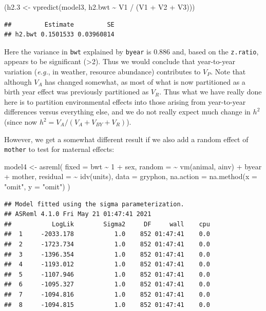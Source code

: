 \documentclass[
  12pt,
]{book}
\newenvironment{Shaded}{\begin{snugshade}}{\end{snugshade}}
\newcommand{\AttributeTok}[1]{\textcolor[rgb]{0.77,0.63,0.00}{#1}}
\newcommand{\DecValTok}[1]{\textcolor[rgb]{0.00,0.00,0.81}{#1}}
\newcommand{\FloatTok}[1]{\textcolor[rgb]{0.00,0.00,0.81}{#1}}
\newcommand{\FunctionTok}[1]{\textcolor[rgb]{0.00,0.00,0.00}{#1}}
\newcommand{\NormalTok}[1]{#1}
\newcommand{\OtherTok}[1]{\textcolor[rgb]{0.56,0.35,0.01}{#1}}
\newcommand{\SpecialCharTok}[1]{\textcolor[rgb]{0.00,0.00,0.00}{#1}}
\newcommand{\StringTok}[1]{\textcolor[rgb]{0.31,0.60,0.02}{#1}}
\begin{document}
\begin{Shaded}
\begin{Highlighting}[]
\NormalTok{(h2}\FloatTok{.3} \OtherTok{\textless{}{-}} \FunctionTok{vpredict}\NormalTok{(model3, h2.bwt }\SpecialCharTok{\textasciitilde{}}\NormalTok{ V1 }\SpecialCharTok{/}\NormalTok{ (V1 }\SpecialCharTok{+}\NormalTok{ V2 }\SpecialCharTok{+}\NormalTok{ V3)))}
\end{Highlighting}
\end{Shaded}

\begin{verbatim}
##         Estimate         SE
## h2.bwt 0.1501533 0.03960814
\end{verbatim}

Here the variance in \texttt{bwt} explained by \texttt{byear} is 0.886 and, based on the \texttt{z.ratio}, appears to be significant (\textgreater2). Thus we would conclude that year-to-year variation (\emph{e.g.}, in weather, resource abundance) contributes to \(V_P\). Note that although \(V_A\) has changed somewhat, as most of what is now partitioned as a birth year effect was previously partitioned as \(V_R\). Thus what we have really done here is to partition environmental effects into those arising from year-to-year differences versus everything else, and we do not really expect much change in \(h^2\) (since now \(h^2 = V_A/ (V_A+V_{BY}+V_R)\)).

However, we get a somewhat different result if we also add a random effect of \texttt{mother} to test for maternal effects:

\begin{Shaded}
\begin{Highlighting}[]
\NormalTok{model4 }\OtherTok{\textless{}{-}} \FunctionTok{asreml}\NormalTok{(}
  \AttributeTok{fixed =}\NormalTok{ bwt }\SpecialCharTok{\textasciitilde{}} \DecValTok{1} \SpecialCharTok{+}\NormalTok{ sex,}
  \AttributeTok{random =} \SpecialCharTok{\textasciitilde{}} \FunctionTok{vm}\NormalTok{(animal, ainv) }\SpecialCharTok{+}\NormalTok{ byear }\SpecialCharTok{+}\NormalTok{ mother,}
  \AttributeTok{residual =} \SpecialCharTok{\textasciitilde{}} \FunctionTok{idv}\NormalTok{(units),}
  \AttributeTok{data =}\NormalTok{ gryphon,}
  \AttributeTok{na.action =} \FunctionTok{na.method}\NormalTok{(}\AttributeTok{x =} \StringTok{"omit"}\NormalTok{, }\AttributeTok{y =} \StringTok{"omit"}\NormalTok{)}
\NormalTok{)}
\end{Highlighting}
\end{Shaded}

\begin{verbatim}
## Model fitted using the sigma parameterization.
## ASReml 4.1.0 Fri May 21 01:47:41 2021
##           LogLik        Sigma2     DF     wall    cpu
##  1     -2033.178           1.0    852 01:47:41    0.0
##  2     -1723.734           1.0    852 01:47:41    0.0
##  3     -1396.354           1.0    852 01:47:41    0.0
##  4     -1193.012           1.0    852 01:47:41    0.0
##  5     -1107.946           1.0    852 01:47:41    0.0
##  6     -1095.327           1.0    852 01:47:41    0.0
##  7     -1094.816           1.0    852 01:47:41    0.0
##  8     -1094.815           1.0    852 01:47:41    0.0
\end{verbatim}
\end{document}

